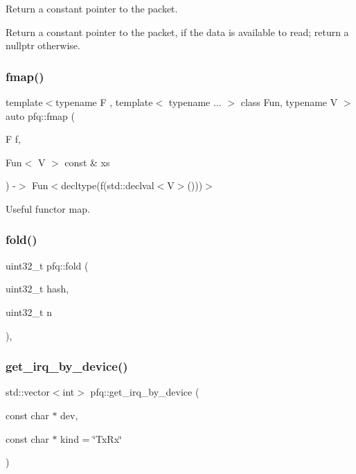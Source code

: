 Return a constant pointer to the packet. 

Return a constant pointer to the packet, if the data is available to read; return a nullptr otherwise. \mbox{\label{namespacepfq_a75e00e20d4294c941fce79c9e884201a}} 
\subsubsection{\texorpdfstring{fmap()}{fmap()}}
{\footnotesize\ttfamily template$<$typename F , template$<$ typename ... $>$ class Fun, typename V $>$ \\
auto pfq\+::fmap (\begin{DoxyParamCaption}\item[{F}]{f,  }\item[{Fun$<$ V $>$ const \&}]{xs }\end{DoxyParamCaption}) -\/$>$ Fun$<$decltype(f(std\+::declval$<$V$>$()))$>$
    \hspace{0.3cm}{\ttfamily [inline]}}



Useful functor map. 

\mbox{\label{namespacepfq_a881bd432d152026217ddbf0ae5d72833}} 
\subsubsection{\texorpdfstring{fold()}{fold()}}
{\footnotesize\ttfamily uint32\+\_\+t pfq\+::fold (\begin{DoxyParamCaption}\item[{uint32\+\_\+t}]{hash,  }\item[{uint32\+\_\+t}]{n }\end{DoxyParamCaption})\hspace{0.3cm}{\ttfamily [inline]}, {\ttfamily [noexcept]}}

\mbox{\label{namespacepfq_ad3359e328bf6619dc4595eadb0d354ba}} 
\subsubsection{\texorpdfstring{get\+\_\+irq\+\_\+by\+\_\+device()}{get\_irq\_by\_device()}}
{\footnotesize\ttfamily std\+::vector$<$int$>$ pfq\+::get\+\_\+irq\+\_\+by\+\_\+device (\begin{DoxyParamCaption}\item[{const char $\ast$}]{dev,  }\item[{const char $\ast$}]{kind = {\ttfamily \char`\"{}TxRx\char`\"{}} }\end{DoxyParamCaption})\hspace{0.3cm}{\ttfamily [inline]}}



